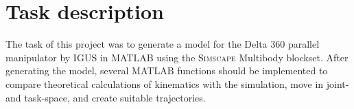 \chapter{Task description}

The task of this project was to generate a model for the Delta 360 parallel manipulator by \textsc{IGUS} in \textsc{MATLAB} using the \textsc{Simscape} Multibody blockset. After generating the model, several \textsc{MATLAB} functions should be implemented to compare theoretical calculations of kinematics with the simulation, move in joint- and task-space, and create suitable trajectories.



